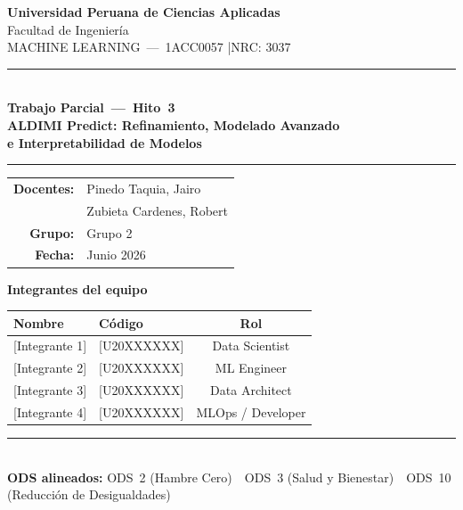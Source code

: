 \documentclass[12pt, a4paper]{article}
\begin{document}

\thispagestyle{empty}
\begin{center}
  \vspace*{1.2cm}
  {\LARGE\bfseries\color{primario} Universidad Peruana de Ciencias Aplicadas}\\[5pt]
  {\large\color{grismed} Facultad de Ingenier\'ia}\\[4pt]
  {\normalsize\color{grismed} MACHINE LEARNING\ ---\ 1ACC0057 \quad|\quad NRC: 3037}

  \vspace{0.8cm}
  \textcolor{primario}{\rule{\linewidth}{2.5pt}}\\[0.5cm]
  {\LARGE\bfseries\color{primario} Trabajo Parcial\ ---\ Hito~3}\\[0.4cm]
  {\large\bfseries\color{gristexto}
    ALDIMI Predict: Refinamiento, Modelado Avanzado\\[3pt]
    e Interpretabilidad de Modelos}\\[0.5cm]
  \textcolor{primario}{\rule{\linewidth}{2.5pt}}

  \vspace{1cm}
  \begin{tabular}{rl}
    \textbf{Docentes:} & Pinedo Taquia, Jairo \\[3pt]
                       & Zubieta Cardenes, Robert \\[8pt]
    \textbf{Grupo:}    & Grupo 2 \\[6pt]
    \textbf{Fecha:}    & Junio 2026 \\
  \end{tabular}

  \vspace{1.2cm}
  {\large\bfseries\color{primario} Integrantes del equipo}\\[8pt]
  \begin{tabular}{llc}
    \toprule
    \rowcolor{primario!15}
    \textbf{Nombre} & \textbf{C\'odigo} & \textbf{Rol} \\
    \midrule
    {[Integrante 1]} & {[U20XXXXXX]} & Data Scientist \\
    {[Integrante 2]} & {[U20XXXXXX]} & ML Engineer \\
    {[Integrante 3]} & {[U20XXXXXX]} & Data Architect \\
    {[Integrante 4]} & {[U20XXXXXX]} & MLOps / Developer \\
    \bottomrule
  \end{tabular}

  \vspace{1.5cm}
  \textcolor{secundario}{\rule{\linewidth}{0.8pt}}\\[5pt]
  {\small\color{grismed}
    \textbf{ODS alineados:}\quad
    ODS~2 (Hambre Cero)\ \textperiodcentered\
    ODS~3 (Salud y Bienestar)\ \textperiodcentered\
    ODS~10 (Reducci\'on de Desigualdades)
  }
\end{center}
\newpage
\end{document}
